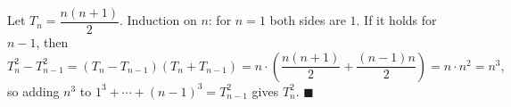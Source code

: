 Let $T_n=\dfrac{n(n+1)}2$. Induction on $n$: for $n=1$ both sides are $1$. If it holds for $n-1$, then
\[T_n^2-T_{n-1}^2=(T_n-T_{n-1})(T_n+T_{n-1})=n\cdot\left(\dfrac{n(n+1)}2+\dfrac{(n-1)n}2\right)=n\cdot n^2=n^3,\]
so adding $n^3$ to $1^3+\cdots+(n-1)^3=T_{n-1}^2$ gives $T_n^2$. $\blacksquare$

